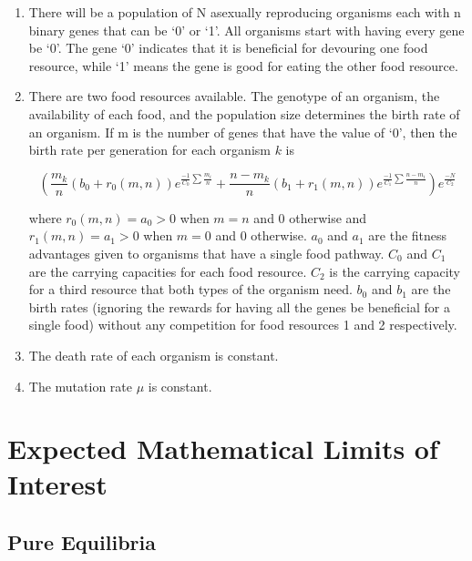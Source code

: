 \documentclass[11pt]{article}
\begin{document}
	\begin{enumerate}
	
		\item
		There will be a population of N asexually reproducing organisms each with n binary genes that can be `0' or `1'. All organisms start with having every gene be `0'. The gene `0' indicates that it is beneficial for devouring one food resource, while `1' means the gene is good for eating the other food resource.
		\item
		There are two food resources available. The genotype of an organism, the availability of each food, and the population size determines the birth rate of an organism. If m is the number of genes that have the value of `0', then the birth rate per generation for each organism $k$ is
		
		\begin{equation*}
			(\frac{m_k}{n}(b_0 + r_0(m,n))e^{\frac{-1}{C_0}\sum{\frac{m_i}{n}}} + \frac{n - m_k}{n}(b_1 + r_1(m,n))e^{\frac{-1}{C_1}\sum{\frac{n - m_i}{n}}})e^{\frac{-N}{C_2}}
		\end{equation*}
		
		where $r_0(m,n) = a_0 > 0$ when $m = n$ and $0$ otherwise and $r_1(m,n) = a_1 > 0$ when $m = 0$ and 0 otherwise. $a_0$ and $a_1$ are the fitness advantages given to organisms that have a single food pathway. $C_0$ and $C_1$ are the carrying capacities for each food resource. $C_2$ is the carrying capacity for a third resource that both types of the organism need. $b_0$ and $b_1$ are the birth rates (ignoring the rewards for having all the genes be beneficial for a single food) without any competition for food resources 1 and 2 respectively.
		
		
		\item
		The death rate of each organism is constant.
		
		\item
		The mutation rate $\mu$ is constant.
		
		
	\end{enumerate}
	
\section*{Expected Mathematical Limits of Interest}

	\subsection*{Pure Equilibria}
	
\end{document}
